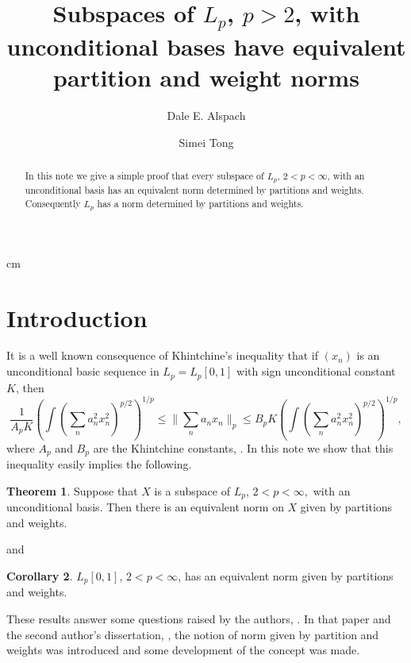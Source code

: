\documentclass[12pt]{amsart}
\theoremstyle{definition}
\newtheorem{theorem}{Theorem}[section]
\newtheorem{corollary}[theorem]{Corollary}
\theoremstyle{remark}
\numberwithin{equation}{section}
\begin{document}

\title[Subspaces of $L_p$ with unconditional bases]{Subspaces of $L_p$, $p>2$, with unconditional bases have equivalent partition and
weight norms}
   
 cm
\author {Dale E. Alspach}
\address{Department of Mathematics, Oklahoma State
   University, Stillwater, OK 74078}
\author {Simei Tong}
\address{Department of Mathematics, University of Wisconsin-Eau
   Claire, Eau Claire, WI 54702}

\begin{abstract} In this note we give a simple proof that every subspace
of $L_p$, $2<p<\infty$, with an unconditional basis has an equivalent norm
determined by
partitions and weights. Consequently $L_p$ has a norm determined by partitions
and weights.
\end{abstract}
\maketitle

\section{Introduction}
It is a well known consequence of Khintchine's inequality
that if $(x_n)$ is an unconditional basic sequence in $L_p=L_p[0,1]$
with sign unconditional constant $K$, then
$$
\frac{1}{A_pK}\left ( \int \left (\sum_n a_n^2 x_n^2 \right )^{p/2}\right )^{1/p} 
\le \|\sum_n a_n x_n\|_p \le B_p K\left ( \int \left (\sum_n a_n^2 x_n^2 \right )^{p/2}\right )^{1/p},
		$$
		where $A_p$ and $B_p$ are the Khintchine constants, \cite[Inequality 1.7]{Lp}. In this note we show that this inequality easily implies the following.

		\begin{theorem} Suppose that $X$ is a subspace of $L_p$, $2<p<\infty,$ with
		an unconditional basis. Then there is an equivalent norm on $X$ given
by partitions and weights.
\end{theorem}

and

\begin{corollary} $L_p[0,1]$, $2<p<\infty$,
 has an equivalent norm given by partitions and weights.
\end{corollary}

These results answer some questions raised by the authors, \cite{AT}. In
that paper and the second author's dissertation, \cite{Tong}, the notion of norm
given by partition and weights was introduced and some development of
the concept was made.
\end{document}
